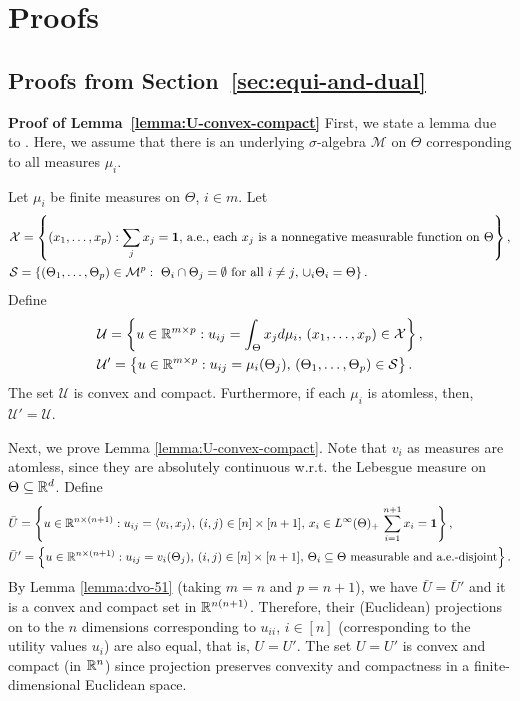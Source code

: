 
\section{Proofs} \label{app:proofs}

\subsection{Proofs from Section~\ref{sec:equi-and-dual}}
	\noindent\textbf{Proof of Lemma~\ref{lemma:U-convex-compact}}
	First, we state a lemma due to \citet[Theorems 1 and 4]{dvoretzky1951relations}. Here, we assume that there is an underlying $\sigma$-algebra $\mathcal{M}$ on $\Theta$ corresponding to all measures $\mu_i$.
	\begin{lemma}
		Let $\mu_i$ be finite measures on $\Theta$, $i\in m$. 
		Let 
		\begin{align*}
			& \mathcal{X} = \left\{ (x_1, \dots, x_p): \sum_j x_j = \mathbf{1}, \, \textnormal{a.e.},\, \text{each $x_j$ is a nonnegative measurable function on $\Theta$} \right\}, \\
			& \mathcal{S} = \left\{ (\Theta_1, \dots, \Theta_p) \in \mathcal{M}^p: \text{ $\Theta_i \cap \Theta_j = \emptyset$ for all $i\neq j$, $\cup_i \Theta_i = \Theta$}\right\}.
		\end{align*}
		Define 
		\begin{align*}
			& \mathcal{U} = \left\{ u\in \mathbb{R}^{m\times p}: u_{ij} = \int_{\Theta} x_j d\mu_i,\, (x_1, \dots, x_p)\in\mathcal{X} \right\}, \\
			& \mathcal{U}' = \left\{ u\in \mathbb{R}^{m\times p}: u_{ij} = \mu_i(\Theta_j),\, (\Theta_1, \dots, \Theta_p) \in \mathcal{S} \right\}.
		\end{align*}
		The set $\mathcal{U}$ is convex and compact. Furthermore, if each $\mu_i$ is atomless, then, $\mathcal{U}' = \mathcal{U}$.
		\label{lemma:dvo-51}
	\end{lemma}

	Next, we prove Lemma \ref{lemma:U-convex-compact}.
	Note that $v_i$ as measures are atomless, since they are absolutely continuous w.r.t. the Lebesgue measure on $\Theta\subseteq \mathbb{R}^d$.
	Define 
	\begin{align*}
		& \bar{U} = \left\{ u \in \mathbb{R}^{n\times (n+1)}: u_{ij} = \langle v_i, x_j\rangle,\, (i,j)\in [n]\times [n+1],\, x_i \in L^\infty(\Theta)_+\, \sum_{i=1}^{n+1} x_i = \mathbf{1} \right\}, \\ 
		& \bar{U}' = \left\{ u \in \mathbb{R}^{n\times (n+1)}: u_{ij} = v_i(\Theta_j),\, (i,j)\in [n]\times [n+1],\, \textnormal{$\Theta_i\subseteq \Theta$ measurable and a.e.-disjoint}\right\}.
	\end{align*}
	By Lemma \ref{lemma:dvo-51} (taking $m=n$ and $p=n+1$), we have $\bar{U} = \bar{U}'$
	and it is a convex and compact set in $\mathbb{R}^{n(n+1)}$.
	Therefore, their (Euclidean) projections on to the $n$ dimensions corresponding to $u_{ii}$, $i\in [n]$ (corresponding to the utility values $u_i$) are also equal, that is, 
	$U = U'$.
	The set $U=U'$ is convex and compact (in $\mathbb{R}^n$) since projection preserves convexity and compactness in a finite-dimensional Euclidean space.

